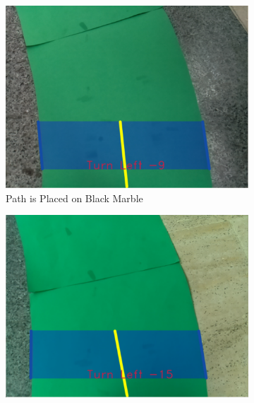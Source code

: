 \documentclass[a4paper,12pt]{article}
\begin{document}
\begin{figure}[H]

\setlength{\unitlength}{\textwidth} 

\centering

\begin{subfigure}{.31\textwidth}

\centering

\includegraphics[width=0.30\unitlength]{images/path_images/inside-bb}

\caption{\label{fig:dataP_inside-bb} Path is Placed on Black Marble}

\end{subfigure}%
\begin{subfigure}{.31\textwidth}

\centering

\includegraphics[width=0.30\unitlength]{images/path_images/inside-bw}


\end{subfigure}
\end{figure}
\end{document}

